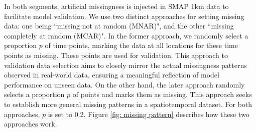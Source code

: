 \documentclass[review]{elsarticle}
\begin{document}
In both segments, artificial missingness is injected in SMAP 1km data to facilitate model validation.  We use two distinct approaches for setting missing data: one being ``missing not at random (MNAR)", and the other ``missing completely at random (MCAR)". In the former approach, we randomly select a proportion $p$ of time points, marking the data at all locations for these time points as missing. These points are used for validation. This approach to validation data selection aims to closely mirror the actual missingness patterns observed in real-world data, ensuring a meaningful reflection of model performance on unseen data. On the other hand, the later approach randomly selects a proportion $p$ of points and marks them as missing. This approach seeks to establish more general missing patterns in a spatiotemporal dataset. For both approaches, $p$ is set to 0.2. Figure \ref{fig: missing pattern} describes how these two approaches work.
\end{document}
